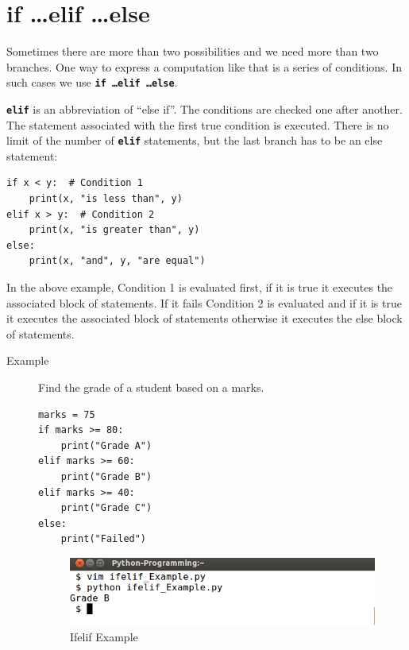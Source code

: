 \documentclass[11pt,a4paper]{article}
\newcommand{\Code}[1]{\textbf{\texttt{#1}}}
\begin{document}
\section*{if \ldots elif \ldots else}
Sometimes there are more than two possibilities and we need more than two branches. One way to express a computation like that is a series of conditions. In such cases we use \Code{if \ldots elif \ldots else}.

\Code{elif} is an abbreviation of ``else if''. The conditions are checked one after another. The statement associated with the first true condition is executed. There is no limit of the number of \Code{elif} statements, but the last branch has to be an else statement:
\begin{verbatim}
if x < y:  # Condition 1
    print(x, "is less than", y)
elif x > y:  # Condition 2
    print(x, "is greater than", y)
else:
    print(x, "and", y, "are equal")
\end{verbatim}
In the above example, Condition 1 is evaluated first, if it is true it executes the associated block of statements. If it fails Condition 2 is evaluated and if it is true it executes the associated block of statements otherwise it executes the else block of statements.

\begin{description}
\item[Example ] Find the grade of a student based on a marks.
\begin{lstlisting}
marks = 75
if marks >= 80:
    print("Grade A")
elif marks >= 60:
    print("Grade B")
elif marks >= 40:
    print("Grade C")
else:
    print("Failed")
\end{lstlisting}
\begin{figure}[ht]
\begin{center}
\includegraphics[scale=0.4]{Output_ifelif_Example.png}
\caption{Ifelif Example}
\label{Ifelif_Example}\end{center}
\end{figure}
\end{description}
\end{document}
